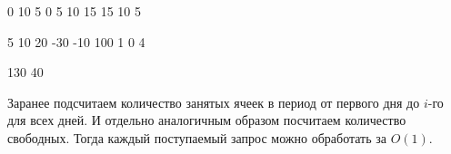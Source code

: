 \begin{myverbbox}[\small]{\voutput}
    0 10
    5 0
    5 10
    15 15
    10 5
\end{myverbbox}


\begin{myverbbox}[\small]{\vinput}
    5
    10 20 -30 -10 100
    1
    0 4
\end{myverbbox}

\begin{myverbbox}[\small]{\voutput}
    130 40
\end{myverbbox}

\solutionSection

Заранее подсчитаем количество занятых ячеек в период от первого дня до $i$-го для всех дней. И отдельно аналогичным образом посчитаем количество свободных. Тогда каждый поступаемый запрос можно обработать за $O(1)$.

